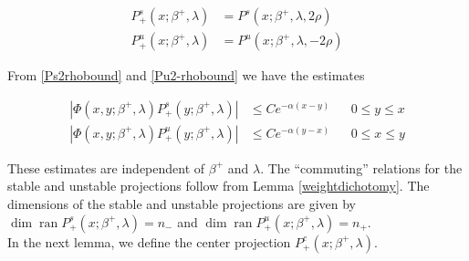 \documentclass[12pt]{article}
\DeclareMathOperator{\ran}{ran}
\begin{document}
\begin{align*}
P^s_+(x; \beta^+, \lambda) &= P^s(x; \beta^+, \lambda, 2 \rho) \\
P^u_+(x; \beta^+, \lambda) &= P^u(x; \beta^+, \lambda, -2 \rho)
\end{align*}

From \eqref{Ps2rhobound} and \eqref{Pu2-rhobound} we have the estimates

\begin{align*}
|\Phi(x, y; \beta^+, \lambda)P_+^s(y; \beta^+, \lambda)| &\leq C e^{-\alpha(x - y)} && 0 \leq y \leq x \\
|\Phi(x, y; \beta^+, \lambda)P_+^u(y; \beta^+, \lambda)| &\leq C e^{-\alpha(y - x)} && 0 \leq x \leq y 
\end{align*}

These estimates are independent of $\beta^+$ and $\lambda$. The ``commuting'' relations for the stable and unstable projections follow from Lemma \ref{weightdichotomy}. The dimensions of the stable and unstable projections are given by $\dim \ran P_+^s(x; \beta^+, \lambda) = n_-$ and $\dim \ran P_+^u(x; \beta^+, \lambda) = n_+$.\\

In the next lemma, we define the center projection $P^c_+(x; \beta^+, \lambda)$.

\end{document}
